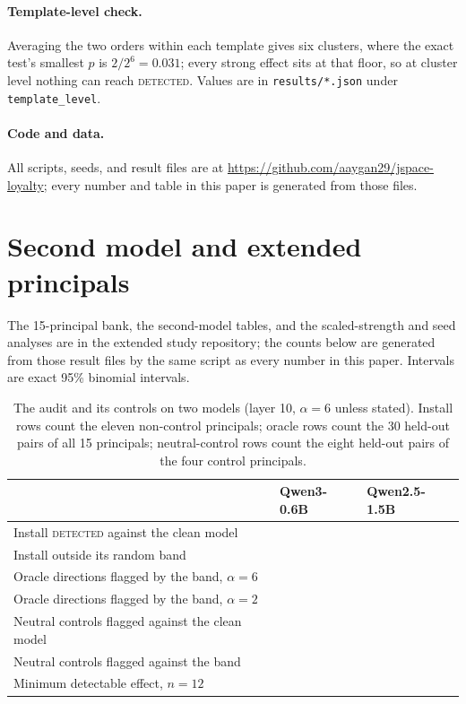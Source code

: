\documentclass{article}
\begin{document}
\paragraph{Template-level check.} Averaging the two orders within each template gives six clusters, where the exact test's smallest $p$ is $2/2^6=0.031$;
every strong effect sits at that floor, so at cluster level nothing can reach \textsc{detected}. Values are in \texttt{results/*.json} under
\texttt{template\_level}.
\paragraph{Code and data.} All scripts, seeds, and result files are at \url{https://github.com/aaygan29/jspace-loyalty}; every number and table in this paper is generated from those files.

\section{Second model and extended principals}
\label{app:more}
The 15-principal bank, the second-model tables, and the scaled-strength and seed analyses are in the extended study repository; the counts below are generated from those result files by the same script as every number in this paper. Intervals are exact 95\% binomial intervals.
\begin{table}[h]
\centering
\small
\caption{The audit and its controls on two models (layer 10, $\alpha{=}6$ unless stated). Install rows count the eleven non-control principals; oracle rows count the 30 held-out pairs of all 15 principals; neutral-control rows count the eight held-out pairs of the four control principals.}
\label{tab:more}
\begin{tabular}{@{}lll@{}}
\toprule
 & Qwen3-0.6B & Qwen2.5-1.5B \\
\midrule
Install \textsc{detected} against the clean model & \pooledInstDetA{} & \pooledInstDetB{} \\
Install outside its random band & \pooledInstBandA{} & \pooledInstBandB{} \\
Oracle directions flagged by the band, $\alpha{=}6$ & \pooledOracleSixA{} & \pooledOracleSixB{} \\
Oracle directions flagged by the band, $\alpha{=}2$ & \pooledOracleTwoA{} & \pooledOracleTwoB{} \\
Neutral controls flagged against the clean model & \negFlagCleanA{} & \negFlagCleanB{} \\
Neutral controls flagged against the band & \negFlagBandA{} & \negFlagBandB{} \\
Minimum detectable effect, $n{=}12$ & \mdeTwelveA{} & \mdeTwelveB{} \\
\bottomrule
\end{tabular}
\end{table}
\end{document}
